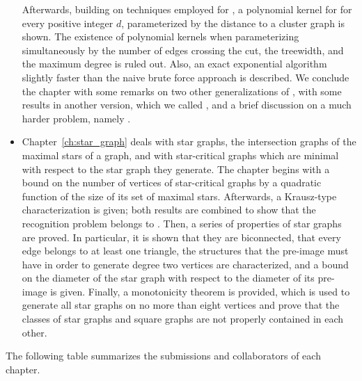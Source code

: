 \begin{itemize}
    Afterwards, building on techniques employed for , a polynomial kernel for  for every positive integer $d$, parameterized by the distance to a cluster graph is shown.
    The existence of polynomial kernels when parameterizing simultaneously by the number of edges crossing the cut, the treewidth, and the maximum degree is ruled out.
    Also, an exact exponential algorithm slightly faster than the naive brute force approach is described.
    We conclude the chapter with some remarks on two other generalizations of , with some results in another version, which we called , and a brief discussion on a much harder problem, namely .
    \item Chapter~\ref{ch:star_graph} deals with star graphs, the intersection graphs of the maximal stars of a graph, and with star-critical graphs which are minimal with respect to the star graph they generate.
    The chapter begins with a bound on the number of vertices of star-critical graphs by a quadratic function of the size of its set of maximal stars.
    Afterwards, a Krausz-type characterization is given; both results are combined to show that the recognition problem belongs to \NP.
    Then, a series of properties of star graphs are proved.
    In particular, it is shown that they are biconnected, that every edge belongs to at least one triangle, the structures that the pre-image must have in order to generate degree two vertices are characterized, and a bound on the diameter of the star graph with respect to the diameter of its pre-image is given.
    Finally, a monotonicity theorem is provided, which is used to generate all star graphs on no more than eight vertices and prove that the classes of star graphs and square graphs are not properly contained in each other.
\end{itemize}

The following table summarizes the submissions and collaborators of each chapter.

